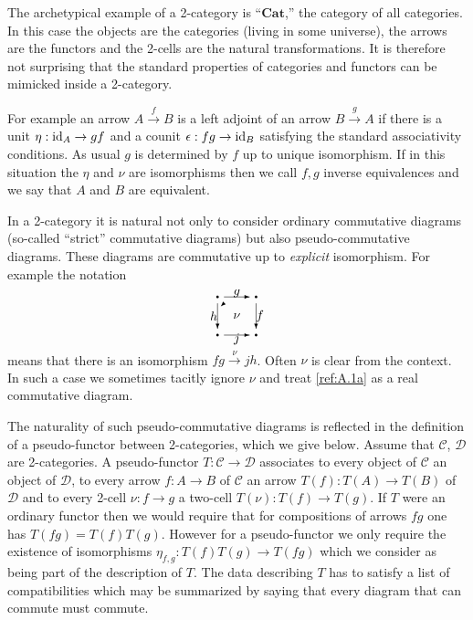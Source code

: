 \documentclass{amsproc}
\def\Cscr{{\mathcal C}}
\def\Dscr{{\mathcal D}}
\def\Id{\text{id}}
\def\r{\rightarrow}
\let\oldtext\text
\def\text#1{\oldtext{\upshape #1}}
\theoremstyle{definition}
\theoremstyle{remark}
\numberwithin{equation}{section}
\numberwithin{table}{section}
\numberwithin{figure}{section}
\begin{document}
The archetypical example of a 2-category is ``$\mathbf{Cat}$,'' the
category of all categories. In this case the objects are the
categories (living in some universe), the arrows are the functors and
the 2-cells are the natural transformations. It is therefore not
surprising that the standard properties of categories and functors can
be mimicked inside a 2-category.


For example an arrow $A\xrightarrow{f}B$ is a left adjoint of an arrow
$B\xrightarrow{g}A$ if there is a unit $\eta:\Id_{A}\r gf$ and a
counit $\epsilon:fg\r \Id_B$ satisfying the standard associativity
conditions.  As usual $g$ is determined by $f$ up to unique
isomorphism. If in this situation the $\eta$ and $\nu$ are
isomorphisms then we call $f,g$ inverse equivalences and we say that $A$
and $B$ are equivalent.

In a 2-category it is natural not only to consider ordinary
commutative diagrams (so-called ``strict'' commutative diagrams) but
also pseudo-commutative diagrams. These  diagrams are commutative
up to \emph{explicit} isomorphism. For example the notation
\begin{equation}
\label{ref:A.1a}
\begin{picture}(40,40)
\put(2,20){\makebox(0,0){$h$}}
\put(20,2){\makebox(0,0){$j$}}
\put(38,20){\makebox(0,0){$f$}}
\put(20,38){\makebox(0,0){$g$}}
\put(20,20){\makebox(0,0){$\nu$}}
\put(10,5){\vector(1,0){20}}
\put(5,30){\vector(0,-1){20}}
\put(10,35){\vector(1,0){20}}
\put(35,30){\vector(0,-1){20}}
\put(5,5){\circle*{2}}
\put(35,5){\circle*{2}}
\put(5,35){\circle*{2}}
\put(35,35){\circle*{2}}
\put(12.5,32.5){\vector(-1,-1){5}}
\end{picture}
\end{equation}
means that there is an isomorphism $fg\xrightarrow{\nu}jh$. Often $\nu$
is  clear from the context. In such a case we
sometimes tacitly ignore $\nu$ and treat \eqref{ref:A.1a} as a real
commutative diagram.

The naturality of such pseudo-commutative diagrams is reflected in the
definition of a pseudo-functor \cite{KS} between 2-categories, which
we give below. Assume that $\Cscr$, $\Dscr$ are 2-categories. A
pseudo-functor $T:\Cscr\r \Dscr$ associates to every object of $\Cscr$
an object of $\Dscr$, to every arrow $f:A\r B$ of $\Cscr$ an arrow
$T(f):T(A)\r T(B)$ of $\Dscr$ and to every 2-cell $\nu:f\r g$ a two-cell
$T(\nu):T(f)\r T(g)$. If $T$ were an ordinary functor then we would
require that for compositions of arrows $fg$ one has $T(fg)=T(f)T(g)$.
However for a pseudo-functor we only require the existence of
isomorphisms $\eta_{f,g}:T(f)T(g)\r T(fg)$  which we consider as being part of
the description of $T$.  The data describing $T$ has to satisfy a
list of compatibilities which may be summarized by saying that every
diagram that can commute must commute.
\end{document}
